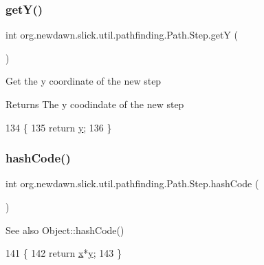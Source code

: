 \subsubsection{\texorpdfstring{get\+Y()}{getY()}}
{\footnotesize\ttfamily int org.\+newdawn.\+slick.\+util.\+pathfinding.\+Path.\+Step.\+getY (\begin{DoxyParamCaption}{ }\end{DoxyParamCaption})\hspace{0.3cm}{\ttfamily [inline]}}

Get the y coordinate of the new step

\begin{DoxyReturn}{Returns}
The y coodindate of the new step 
\end{DoxyReturn}

\begin{DoxyCode}
134                           \{
135             \textcolor{keywordflow}{return} \mbox{\hyperlink{classorg_1_1newdawn_1_1slick_1_1util_1_1pathfinding_1_1_path_1_1_step_ae77364516b69d2b5ed5ed550413c05e9}{y}};
136         \}
\end{DoxyCode}
\mbox{\label{classorg_1_1newdawn_1_1slick_1_1util_1_1pathfinding_1_1_path_1_1_step_ab074c861e710aac6fd7c6a831aaf9ad7}} 
\subsubsection{\texorpdfstring{hash\+Code()}{hashCode()}}
{\footnotesize\ttfamily int org.\+newdawn.\+slick.\+util.\+pathfinding.\+Path.\+Step.\+hash\+Code (\begin{DoxyParamCaption}{ }\end{DoxyParamCaption})\hspace{0.3cm}{\ttfamily [inline]}}

\begin{DoxySeeAlso}{See also}
Object\+::hash\+Code() 
\end{DoxySeeAlso}

\begin{DoxyCode}
141                               \{
142             \textcolor{keywordflow}{return} \mbox{\hyperlink{classorg_1_1newdawn_1_1slick_1_1util_1_1pathfinding_1_1_path_1_1_step_a6764404c2d713db22efbeb2ec33cbdc1}{x}}*\mbox{\hyperlink{classorg_1_1newdawn_1_1slick_1_1util_1_1pathfinding_1_1_path_1_1_step_ae77364516b69d2b5ed5ed550413c05e9}{y}};
143         \}
\end{DoxyCode}


